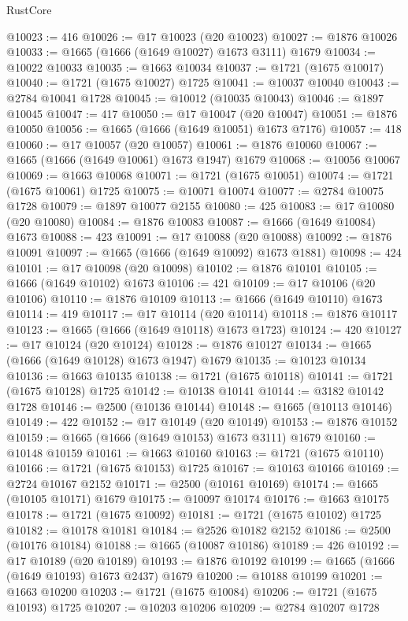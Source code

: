 \begin{lexlean}{RustCore}
\begin{coremodule}
@10023 := 416
@10026 := @17 @10023 (@20 @10023)
@10027 := @1876 @10026
@10033 := @1665 (@1666 (@1649 @10027) @1673 @3111) @1679
@10034 := @10022 @10033
@10035 := @1663 @10034
@10037 := @1721 (@1675 @10017)
@10040 := @1721 (@1675 @10027) @1725
@10041 := @10037 @10040
@10043 := @2784 @10041 @1728
@10045 := @10012 (@10035 @10043)
@10046 := @1897 @10045
@10047 := 417
@10050 := @17 @10047 (@20 @10047)
@10051 := @1876 @10050
@10056 := @1665 (@1666 (@1649 @10051) @1673 @7176)
@10057 := 418
@10060 := @17 @10057 (@20 @10057)
@10061 := @1876 @10060
@10067 := @1665 (@1666 (@1649 @10061) @1673 @1947) @1679
@10068 := @10056 @10067
@10069 := @1663 @10068
@10071 := @1721 (@1675 @10051)
@10074 := @1721 (@1675 @10061) @1725
@10075 := @10071 @10074
@10077 := @2784 @10075 @1728
@10079 := @1897 @10077 @2155
@10080 := 425
@10083 := @17 @10080 (@20 @10080)
@10084 := @1876 @10083
@10087 := @1666 (@1649 @10084) @1673
@10088 := 423
@10091 := @17 @10088 (@20 @10088)
@10092 := @1876 @10091
@10097 := @1665 (@1666 (@1649 @10092) @1673 @1881)
@10098 := 424
@10101 := @17 @10098 (@20 @10098)
@10102 := @1876 @10101
@10105 := @1666 (@1649 @10102) @1673
@10106 := 421
@10109 := @17 @10106 (@20 @10106)
@10110 := @1876 @10109
@10113 := @1666 (@1649 @10110) @1673
@10114 := 419
@10117 := @17 @10114 (@20 @10114)
@10118 := @1876 @10117
@10123 := @1665 (@1666 (@1649 @10118) @1673 @1723)
@10124 := 420
@10127 := @17 @10124 (@20 @10124)
@10128 := @1876 @10127
@10134 := @1665 (@1666 (@1649 @10128) @1673 @1947) @1679
@10135 := @10123 @10134
@10136 := @1663 @10135
@10138 := @1721 (@1675 @10118)
@10141 := @1721 (@1675 @10128) @1725
@10142 := @10138 @10141
@10144 := @3182 @10142 @1728
@10146 := @2500 (@10136 @10144)
@10148 := @1665 (@10113 @10146)
@10149 := 422
@10152 := @17 @10149 (@20 @10149)
@10153 := @1876 @10152
@10159 := @1665 (@1666 (@1649 @10153) @1673 @3111) @1679
@10160 := @10148 @10159
@10161 := @1663 @10160
@10163 := @1721 (@1675 @10110)
@10166 := @1721 (@1675 @10153) @1725
@10167 := @10163 @10166
@10169 := @2724 @10167 @2152
@10171 := @2500 (@10161 @10169)
@10174 := @1665 (@10105 @10171) @1679
@10175 := @10097 @10174
@10176 := @1663 @10175
@10178 := @1721 (@1675 @10092)
@10181 := @1721 (@1675 @10102) @1725
@10182 := @10178 @10181
@10184 := @2526 @10182 @2152
@10186 := @2500 (@10176 @10184)
@10188 := @1665 (@10087 @10186)
@10189 := 426
@10192 := @17 @10189 (@20 @10189)
@10193 := @1876 @10192
@10199 := @1665 (@1666 (@1649 @10193) @1673 @2437) @1679
@10200 := @10188 @10199
@10201 := @1663 @10200
@10203 := @1721 (@1675 @10084)
@10206 := @1721 (@1675 @10193) @1725
@10207 := @10203 @10206
@10209 := @2784 @10207 @1728

\end{coremodule}
\end{lexlean}
